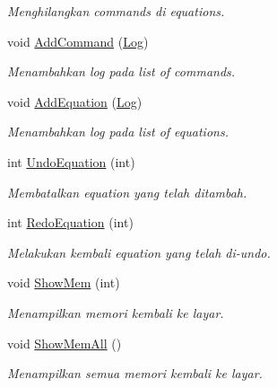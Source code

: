 \begin{DoxyCompactItemize}
\begin{DoxyCompactList}\small\item\em Menghilangkan commands di equations. \end{DoxyCompactList}\item 
void \hyperlink{class_logger_a5b252a46f23b39518ec7984a04b04d5a}{Add\+Command} (\hyperlink{class_log}{Log})
\begin{DoxyCompactList}\small\item\em Menambahkan log pada list of commands. \end{DoxyCompactList}\item 
void \hyperlink{class_logger_a97e6d60cd413fbd1e10f46be2648ffea}{Add\+Equation} (\hyperlink{class_log}{Log})
\begin{DoxyCompactList}\small\item\em Menambahkan log pada list of equations. \end{DoxyCompactList}\item 
int \hyperlink{class_logger_aafe697aae2c001604c9eefde6c858bd7}{Undo\+Equation} (int)
\begin{DoxyCompactList}\small\item\em Membatalkan equation yang telah ditambah. \end{DoxyCompactList}\item 
int \hyperlink{class_logger_ae4db4ef133988b05ebfd290fc882b326}{Redo\+Equation} (int)
\begin{DoxyCompactList}\small\item\em Melakukan kembali equation yang telah di-\/undo. \end{DoxyCompactList}\item 
void \hyperlink{class_logger_a5e42b642372b04412b0489133ccce892}{Show\+Mem} (int)
\begin{DoxyCompactList}\small\item\em Menampilkan memori kembali ke layar. \end{DoxyCompactList}\item 
\hypertarget{class_logger_aa52536c24887d0ba9c9ed52460ef837d}{}void \hyperlink{class_logger_aa52536c24887d0ba9c9ed52460ef837d}{Show\+Mem\+All} ()\label{class_logger_aa52536c24887d0ba9c9ed52460ef837d}

\begin{DoxyCompactList}\small\item\em Menampilkan semua memori kembali ke layar. \end{DoxyCompactList}\end{DoxyCompactItemize}


